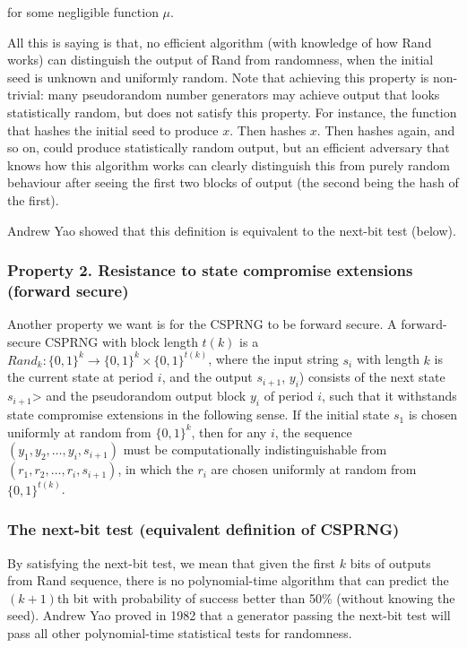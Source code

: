 \documentclass{article}
\begin{document}
\noindent for some negligible function $\mu$.

All this is saying is that, no efficient algorithm (with knowledge of how Rand works) can distinguish the output of Rand from randomness, when the initial seed is unknown and uniformly random. Note that achieving this property is non-trivial: many pseudorandom number generators may achieve output that looks statistically random, but does not satisfy this property. For instance, the function that hashes the initial seed to produce $x$. Then hashes $x$. Then hashes again, and so on, could produce statistically random output, but an efficient adversary that knows how this algorithm works can clearly distinguish this from purely random behaviour after seeing the first two blocks of output (the second being the hash of the first).

Andrew Yao showed that this definition is equivalent to the next-bit test (below).

\subsubsection*{Property 2. Resistance to state compromise extensions (forward secure)}
Another property we want is for the CSPRNG to be forward secure. A forward-secure CSPRNG with block length $t(k)$ is a $Rand_{k} \colon \{0,1\}^k \to \{0,1\}^k \times \{0,1\}^{t(k)}$, where the input string $s_i$ with length $k$ is the current state at period $i$, and the output $s_{i+1}$, $y_i$) consists of the next state $s_{i+1}$> and the pseudorandom output block $y_i$ of period $i$, such that it withstands state compromise extensions in the following sense. If the initial state $s_1$ is chosen uniformly at random from $\{0,1\}^k$, then for any $i$, the sequence $(y_1, y_2,\dots, y_i,s_{i+1})$ must be computationally indistinguishable from $(r_1,r_2,\dots,r_i,s_{i+1})$, in which the $r_i$ are chosen uniformly at random from $\{0,1\}^{t(k)}$.

\subsubsection*{The next-bit test (equivalent definition of CSPRNG)}
By satisfying the next-bit test, we mean that given the first $k$ bits of outputs from Rand sequence, there is no polynomial-time algorithm that can predict the $(k+1)$th bit with probability of success better than 50\% (without knowing the seed). Andrew Yao proved in 1982 that a generator passing the next-bit test will pass all other polynomial-time statistical tests for randomness.
\end{document}

